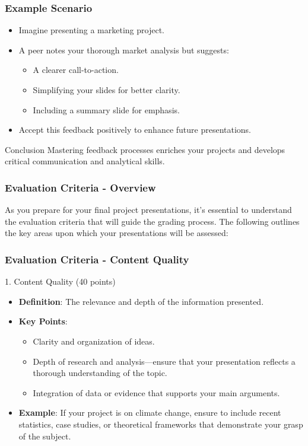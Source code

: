 \documentclass[aspectratio=169]{beamer}
\begin{document}
\begin{frame}[fragile]
    \frametitle{Example Scenario}
    \begin{itemize}
        \item Imagine presenting a marketing project.
        \item A peer notes your thorough market analysis but suggests:
            \begin{itemize}
                \item A clearer call-to-action.
                \item Simplifying your slides for better clarity.
                \item Including a summary slide for emphasis.
            \end{itemize}
        \item Accept this feedback positively to enhance future presentations.
    \end{itemize}
    \begin{block}{Conclusion}
        Mastering feedback processes enriches your projects and develops critical communication and analytical skills.
    \end{block}
\end{frame}

\begin{frame}[fragile]
    \frametitle{Evaluation Criteria - Overview}
    As you prepare for your final project presentations, it's essential to understand the evaluation criteria that will guide the grading process. The following outlines the key areas upon which your presentations will be assessed:
\end{frame}

\begin{frame}[fragile]
    \frametitle{Evaluation Criteria - Content Quality}
    \begin{block}{1. Content Quality (40 points)}
        \begin{itemize}
            \item \textbf{Definition}: The relevance and depth of the information presented.
            \item \textbf{Key Points}:
                \begin{itemize}
                    \item Clarity and organization of ideas.
                    \item Depth of research and analysis—ensure that your presentation reflects a thorough understanding of the topic.
                    \item Integration of data or evidence that supports your main arguments.
                \end{itemize}
            \item \textbf{Example}: If your project is on climate change, ensure to include recent statistics, case studies, or theoretical frameworks that demonstrate your grasp of the subject.
        \end{itemize}
    \end{block}
\end{frame}
\end{document}
